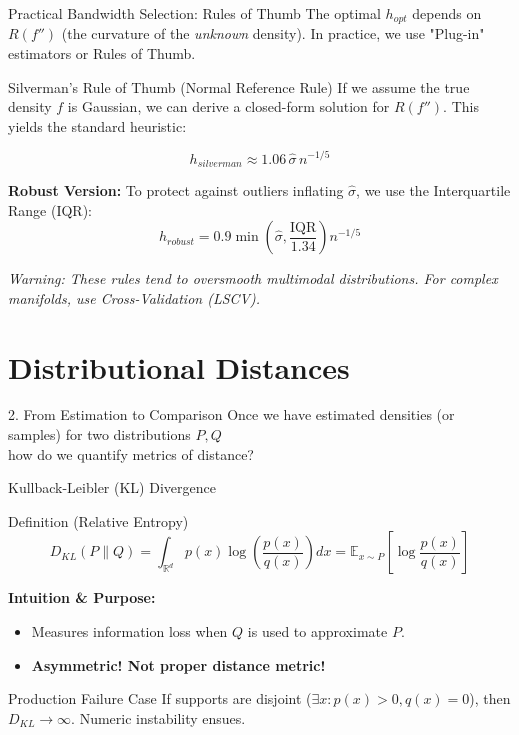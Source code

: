 \documentclass[10pt,aspectratio=169]{ntuabeamer}
\newcommand{\R}{\mathbb{R}}
\newcommand{\E}{\mathbb{E}}
\begin{document}
	\begin{frame}{Practical Bandwidth Selection: Rules of Thumb}
		The optimal $h_{opt}$ depends on $R(f'')$ (the curvature of the \textit{unknown} density). In practice, we use "Plug-in" estimators or Rules of Thumb.
		
		\begin{block}{Silverman's Rule of Thumb (Normal Reference Rule)}
			If we assume the true density $f$ is Gaussian, we can derive a closed-form solution for $R(f'')$. This yields the standard heuristic:
			
			$$ h_{silverman} \approx 1.06 \, \hat{\sigma} \, n^{-1/5} $$
		\end{block}
		
		\textbf{Robust Version:}
		To protect against outliers inflating $\hat{\sigma}$, we use the Interquartile Range (IQR):
		$$ h_{robust} = 0.9 \min\left( \hat{\sigma}, \frac{\text{IQR}}{1.34} \right) n^{-1/5} $$
		
		\textit{Warning: These rules tend to oversmooth multimodal distributions. For complex manifolds, use Cross-Validation (LSCV).}
	\end{frame}
	
	\section{Distributional Distances}
	
	\begin{frame}{2. From Estimation to Comparison}
		Once we have estimated densities (or samples) for two distributions $P, Q$\\
		 how do we quantify metrics of distance?
	\end{frame}
	
	\begin{frame}{Kullback-Leibler (KL) Divergence}
		\begin{block}{Definition (Relative Entropy)}
			$$ D_{KL}(P \| Q) = \int_{\R^d} p(x) \log \left( \frac{p(x)}{q(x)} \right) dx = \E_{x \sim P} \left[\log \frac{p(x)}{q(x)}\right] $$
		\end{block}
		
		\vspace{1em}
		\textbf{Intuition \& Purpose:}
		\begin{itemize}
			\item Measures information loss when $Q$ is used to approximate $P$.
			\item \textbf{Asymmetric! Not proper distance metric!}
		\end{itemize}
		
		\vspace{0.5em}
		\begin{alertblock}{Production Failure Case}
			If supports are disjoint ($\exists x: p(x)>0, q(x)=0$), then $D_{KL} \to \infty$. Numeric instability ensues.
		\end{alertblock}
	\end{frame}
	
\end{document}
